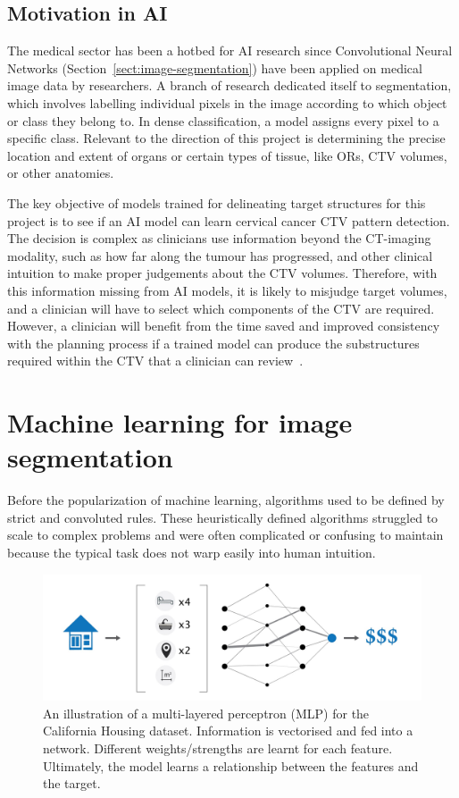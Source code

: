 \documentclass[11pt,twoside]{report}
\begin{document}
\subsection{Motivation in AI}

The medical sector has been a hotbed for AI research since  Convolutional Neural Networks (Section~\ref{sect:image-segmentation}) have been applied on medical image data by researchers. A branch of research dedicated itself to segmentation, which involves labelling individual pixels in the image according to which object or class they belong to. In dense classification, a model assigns every pixel to a specific class. Relevant to the direction of this project is determining the precise location and extent of organs or certain types of tissue, like ORs, CTV volumes, or other anatomies. 

The key objective of models trained for delineating target structures for this project is to see if an AI model can learn cervical cancer CTV pattern detection. The decision is complex as clinicians use information beyond the CT-imaging modality, such as how far along the tumour has progressed, and other clinical intuition to make proper judgements about the CTV volumes. Therefore, with this information missing from AI models, it is likely to misjudge target volumes, and a clinician will have to select which components of the CTV are required. However, a clinician will benefit from the time saved and improved consistency with the planning process if a trained model can produce the substructures required within the CTV that a clinician can review~\cite{AMLART-data}.

\section{Machine learning for image segmentation}\label{sect:machine-learning-for-image-segmentation}

Before the popularization of machine learning, algorithms used to be defined by strict and convoluted rules. These heuristically defined algorithms struggled to scale to complex problems and were often complicated or confusing to maintain because the typical task does not warp easily into human intuition.

\begin{figure}[H]
  \centering
  \includegraphics[width=.7\linewidth]{../figures/california.jpeg}
  \caption{An illustration of a multi-layered perceptron (MLP) for the California Housing dataset. Information is vectorised and fed into a network. Different weights/strengths are learnt for each feature. Ultimately, the model learns a relationship between the features and the target.}\label{fig:california-housing}
\end{figure}
\end{document}
